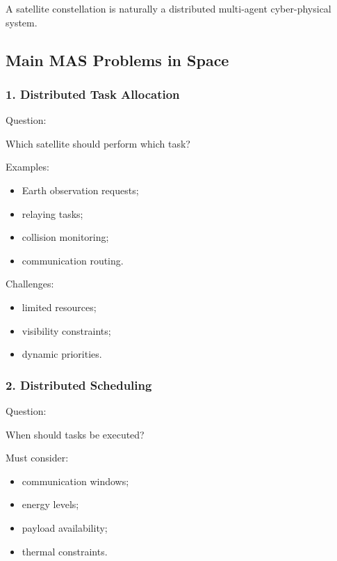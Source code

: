 \documentclass[10pt,a4paper,twocolumn]{article}
\begin{document}
\begin{keybox}
    A satellite constellation is naturally a distributed multi-agent cyber-physical system.
\end{keybox}


\subsection{Main MAS Problems in Space}


\subsubsection*{1. Distributed Task Allocation}

Question:
\begin{center}
    Which satellite should perform which task?
\end{center}

Examples:
\begin{itemize}
    \item Earth observation requests;
    \item relaying tasks;
    \item collision monitoring;
    \item communication routing.
\end{itemize}

Challenges:
\begin{itemize}
    \item limited resources;
    \item visibility constraints;
    \item dynamic priorities.
\end{itemize}


\subsubsection*{2. Distributed Scheduling}

Question:
\begin{center}
    When should tasks be executed?
\end{center}

Must consider:
\begin{itemize}
    \item communication windows;
    \item energy levels;
    \item payload availability;
    \item thermal constraints.
\end{itemize}
\end{document}
